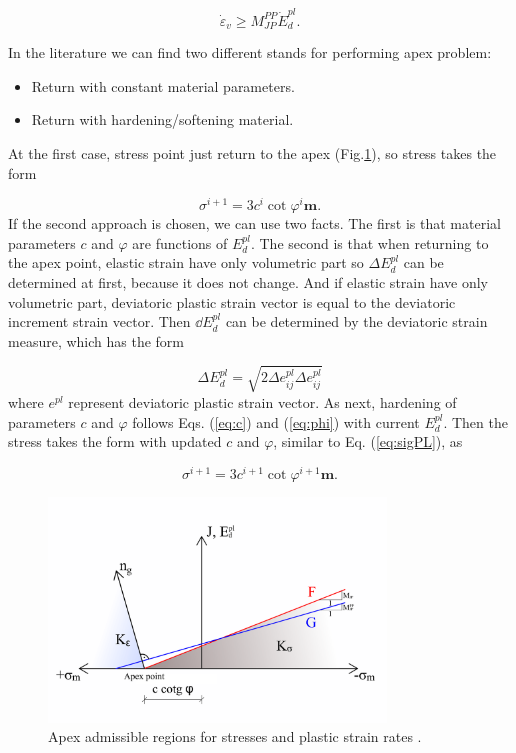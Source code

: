 \begin{equation}\label{eq:eps_apex}
	\dot{\varepsilon}_v \geq M_{JP}^{PP} \dot{E}_d^{pl}.
\end{equation}

In the literature we can find two different stands for performing apex problem:

\begin{itemize}
	\item Return with constant material parameters.
	\item Return with hardening/softening material.
\end{itemize}
At the first case, stress point just return to the apex (Fig.\ref{obr:apex_cones}), so stress takes the form

\begin{equation}\label{eq:sigPL}
	\sigma^{i+1} = 3c^{i} \cot \varphi^{i} \textbf{m}.
\end{equation}
If the second approach is chosen, we can use two facts. The first is that material parameters $c$ and $\varphi$ are functions of $E_d^{pl}$. The second is that when returning to the apex point, elastic strain have only volumetric part so $\Delta E_d^{pl}$ can be determined at first, because it does not change. And if elastic strain have only volumetric part, deviatoric plastic strain vector is equal to the deviatoric increment strain vector. Then $\dd E_d^{pl}$ can be determined by the deviatoric strain measure, which has the form

\begin{equation}\label{eq:sig_i}
	\Delta E_d^{pl} = \sqrt{2\Delta e^{pl}_{ij}\Delta e^{pl}_{ij}}
\end{equation}
where $e^{pl}$ represent deviatoric plastic strain vector. As next, hardening of parameters $c$ and $\varphi$ follows Eqs. (\ref{eq:c}) and (\ref{eq:phi}) with current $E_d^{pl}$. Then the stress takes the form with updated $c$ and $\varphi$, similar to Eq. (\ref{eq:sigPL}), as

\begin{equation}
	\sigma^{i+1} = 3c^{i+1} \cot \varphi^{i+1} \textbf{m}.
\end{equation}

\begin{figure}[h!]
	\centering  
	\includegraphics[width=0.8\textwidth, angle=0]{obrazky/apex_cones_my.png}
	\caption[Apex abmissible regions]{Apex admissible regions for stresses and plastic strain rates \cite{geofem}.} \label{obr:apex_cones}
\end{figure}

